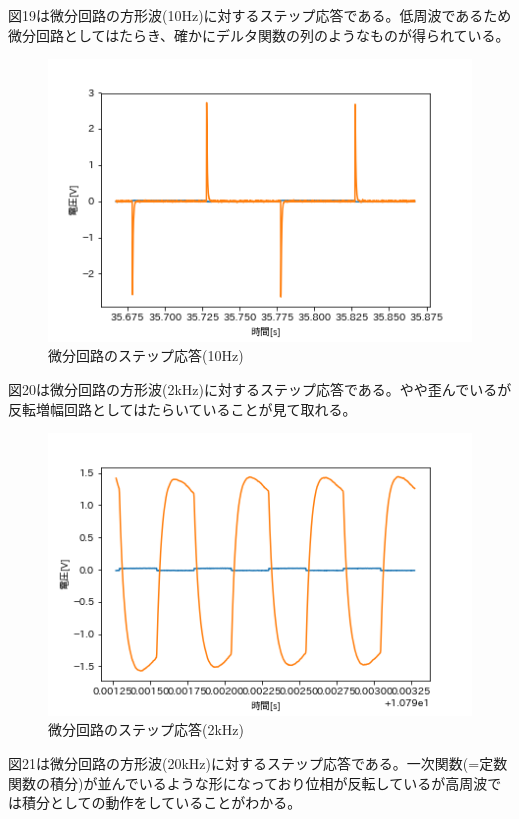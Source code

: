 \documentclass[dvipdfmx, twocolumn]{jsarticle}
\begin{document}
\begin{enumerate}
\begin{itemize}
図19は微分回路の方形波(10Hz)に対するステップ応答である。低周波であるため微分回路としてはたらき、確かにデルタ関数の列のようなものが得られている。
\begin{figure}[H]
\begin{center}
\includegraphics[scale = 0.5]{wavedlow.png}
\caption{微分回路のステップ応答(10Hz)}
\end{center}
\end{figure}

図20は微分回路の方形波(2kHz)に対するステップ応答である。やや歪んでいるが反転増幅回路としてはたらいていることが見て取れる。

\begin{figure}[H]
\begin{center}
\includegraphics[scale = 0.5]{wavedmid.png}
\caption{微分回路のステップ応答(2kHz)}
\end{center}
\end{figure}


図21は微分回路の方形波(20kHz)に対するステップ応答である。一次関数(=定数関数の積分)が並んでいるような形になっており位相が反転しているが高周波では積分としての動作をしていることがわかる。


\end{itemize}
\end{enumerate}
\end{document}
